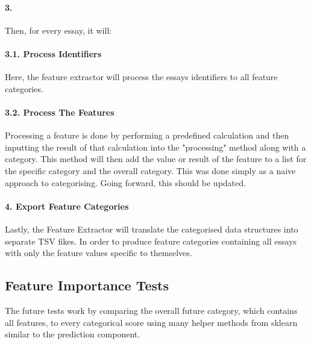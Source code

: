 \paragraph{3.} Then, for every essay, it will:

\paragraph{3.1. Process Identifiers} Here, the feature extractor will process the essays identifiers to all feature categories.


\paragraph{3.2. Process The Features} Processing a feature is done by performing a predefined calculation and then inputting the result of that calculation into the "processing" method along with a category. This method will then add the value or result of the feature to a list for the specific category and the overall category. This was done simply as a naive approach to categorising. Going forward, this should be updated. 

\paragraph{4. Export Feature Categories} Lastly, the Feature Extractor will translate the categorised data structures into separate TSV fikes. In order to produce feature categories containing all essays with only the feature values specific to themselves.

\subsection{Feature Importance Tests}

The future tests work by comparing the overall future category, which contains all features, to every categorical score using many helper methods from sklearn similar to the prediction component. 


